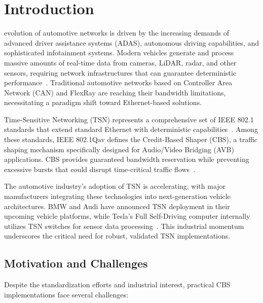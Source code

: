 \documentclass[10pt, journal, compsoc]{IEEEtran}
\begin{document}
\maketitle

\IEEEdisplaynontitleabstractindextext

\IEEEpeerreviewmaketitle

\section{Introduction}
\label{sec:introduction}

 evolution of automotive networks is driven by the increasing demands of advanced driver assistance systems (ADAS), autonomous driving capabilities, and sophisticated infotainment systems. Modern vehicles generate and process massive amounts of real-time data from cameras, LiDAR, radar, and other sensors, requiring network infrastructures that can guarantee deterministic performance~\cite{sudhakaran2022automotive}. Traditional automotive networks based on Controller Area Network (CAN) and FlexRay are reaching their bandwidth limitations, necessitating a paradigm shift toward Ethernet-based solutions.

Time-Sensitive Networking (TSN) represents a comprehensive set of IEEE 802.1 standards that extend standard Ethernet with deterministic capabilities~\cite{nasrallah2018ultra}. Among these standards, IEEE 802.1Qav defines the Credit-Based Shaper (CBS), a traffic shaping mechanism specifically designed for Audio/Video Bridging (AVB) applications. CBS provides guaranteed bandwidth reservation while preventing excessive bursts that could disrupt time-critical traffic flows~\cite{finn2018introduction}.

The automotive industry's adoption of TSN is accelerating, with major manufacturers integrating these technologies into next-generation vehicle architectures. BMW and Audi have announced TSN deployment in their upcoming vehicle platforms, while Tesla's Full Self-Driving computer internally utilizes TSN switches for sensor data processing~\cite{bmw2022tsn, tesla2023fsd}. This industrial momentum underscores the critical need for robust, validated TSN implementations.

\subsection{Motivation and Challenges}

Despite the standardization efforts and industrial interest, practical CBS implementations face several challenges:
\end{document}
